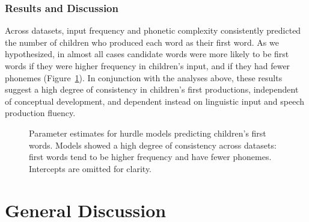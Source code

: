 \documentclass[10pt,letterpaper]{article}
\begin{document}
\subsubsection{Results and Discussion}

Across datasets, input frequency and phonetic complexity consistently predicted the number of children who produced each word as their first word. As we hypothesized, in almost all cases candidate words were more likely to be first words if they were higher frequency in children's input, and if they had fewer phonemes (Figure~\ref{fig:hurdles}). In conjunction with the analyses above, these results suggest a high degree of consistency in children's first productions, independent of conceptual development, and dependent instead on linguistic input and speech production fluency.

\begin{figure}[tb]
\caption{\label{fig:hurdles} Parameter estimates for hurdle models predicting children's first words. Models showed a high degree of consistency across datasets: first words tend to be higher frequency and have fewer phonemes. Intercepts are omitted for clarity.}
\vspace{-1.5em}
\end{figure}

\section{General Discussion}
\end{document}
